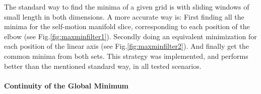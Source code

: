 



The standard way to find the minima of a given grid is with sliding windows of small length in both dimensions. A more accurate way is: First finding all the minima for the self-motion manifold slice, corresponding to each position of the elbow (see Fig.\ref{fig:maxminfilter1}). Secondly doing an equivalent minimization for each position of the linear axis (see Fig.\ref{fig:maxminfilter2}). 
And finally get the common minima from both sets. This strategy was implemented, and performs better than the mentioned standard way, in all tested scenarios. 

\paragraph{Continuity of the Global Minimum}

